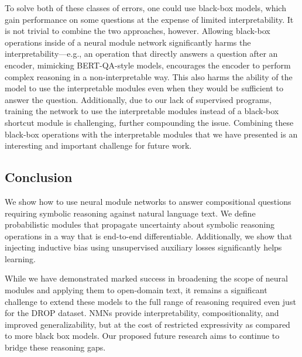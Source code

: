 \documentclass[main.tex]{subfiles}
\begin{document}
To solve both of these classes of errors, one could use black-box models, which gain performance on some questions at the expense of limited interpretability.  It is not trivial to combine the two approaches, however.  Allowing black-box operations inside of a neural module network significantly harms the interpretability---e.g., an operation that directly answers a question after an encoder, mimicking BERT-QA-style models, encourages the encoder to perform complex reasoning in a non-interpretable way. This also harms the ability of the model to use the interpretable modules even when they would be sufficient to answer the question.
Additionally, due to our lack of supervised programs, training the network to use the interpretable modules instead of a black-box shortcut module is challenging, further compounding the issue.
Combining these black-box operations with the interpretable modules that we have presented is an interesting and important challenge for future work.


\subsection{Conclusion}
We show how to use neural module networks to answer compositional questions requiring symbolic reasoning against natural language text.
We define probabilistic modules that propagate uncertainty about symbolic reasoning operations in a way that is end-to-end differentiable.
Additionally, we show that injecting inductive bias using unsupervised auxiliary losses significantly helps learning.

While we have demonstrated marked success in broadening the scope of neural modules and applying them to open-domain text, it remains a significant challenge to extend these models to the full range of reasoning required even just for the DROP dataset.
NMNs provide interpretability, compositionality, and improved generalizability, but at the cost of restricted expressivity as compared to more black box models.
Our proposed future research aims to continue to bridge these reasoning gaps.


\biblio
\end{document}
